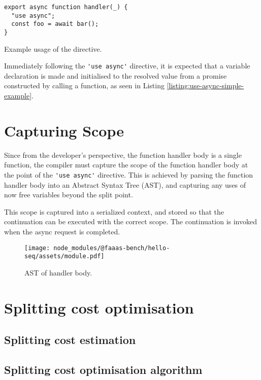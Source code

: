 \begin{listing}[H]
\begin{verbatim}
export async function handler(_) {
  "use async";
  const foo = await bar();
}
\end{verbatim}
\caption{Example usage of the directive.}
\label{listing:use-async-simple-example}
\end{listing}

Immediately following the \verb|'use async'| directive, it is expected that a variable declaration is made and initialised to the resolved value from a promise constructed by calling a function, as seen in Listing \ref{listing:use-async-simple-example}.

\section{Capturing Scope}

Since from the developer's perspective, the function handler body is a single function, the \faaasc{} compiler must capture the scope of the function handler body at the point of the \verb|'use async'| directive. This is achieved by parsing the function handler body into an Abstract Syntax Tree (AST), and capturing any uses of now free variables beyond the split point.

This scope is captured into a serialized context, and stored so that the continuation can be executed with the correct scope. The continuation is invoked when the async request is completed.

\begin{figure}[t]
    \texttt{[image: node\_modules/@faaas-bench/hello-seq/assets/module.pdf]}
    \caption{AST of handler body.}
    \label{fig:suites-hello-seq-module-ast}
\end{figure}

\section{Splitting cost optimisation}

\subsection{Splitting cost estimation}

\subsection{Splitting cost optimisation algorithm}

